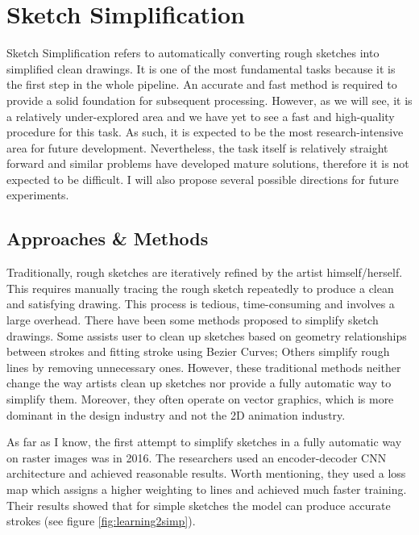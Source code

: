 \chapter{Sketch Simplification}

Sketch Simplification refers to automatically converting rough sketches into simplified clean drawings. It is one of the most fundamental tasks because it is the first step in the whole pipeline. An accurate and fast method is required to provide a solid foundation for subsequent processing. However, as we will see, it is a relatively under-explored area and we have yet to see a fast and high-quality procedure for this task. As such, it is expected to be the most research-intensive area for future development. Nevertheless, the task itself is relatively straight forward and similar problems have developed mature solutions, therefore it is not expected to be difficult. I will also propose several possible directions for future experiments.

\label{chapterlabel4}
\section{Approaches \& Methods}
Traditionally, rough sketches are iteratively refined by the artist himself/herself. This requires manually tracing the rough sketch repeatedly to produce a clean and satisfying drawing. This process is tedious, time-consuming and involves a large overhead. There have been some methods proposed to simplify sketch drawings. Some assists user to clean up sketches based on geometry relationships between strokes\cite{fiserShipShapeDrawingBeautification2015} and fitting stroke using Bezier Curves\cite{baeILoveSketchAsnaturalaspossibleSketching2008}; Others simplify rough lines by removing unnecessary ones\cite{liuClosureawareSketchSimplification2015}. However, these traditional methods neither change the way artists clean up sketches nor provide a fully automatic way to simplify them. Moreover, they often operate on vector graphics, which is more dominant in the design industry and not the 2D animation industry.

As far as I know, the first attempt to simplify sketches in a fully automatic way on raster images was in 2016\cite{simo-serraLearningSimplifyFully2016}. The researchers used an encoder-decoder CNN architecture and achieved reasonable results. Worth mentioning, they used a loss map which assigns a higher weighting to lines and achieved much faster training. Their results showed that for simple sketches the model can produce accurate strokes (see figure \ref{fig:learning2simp}).


